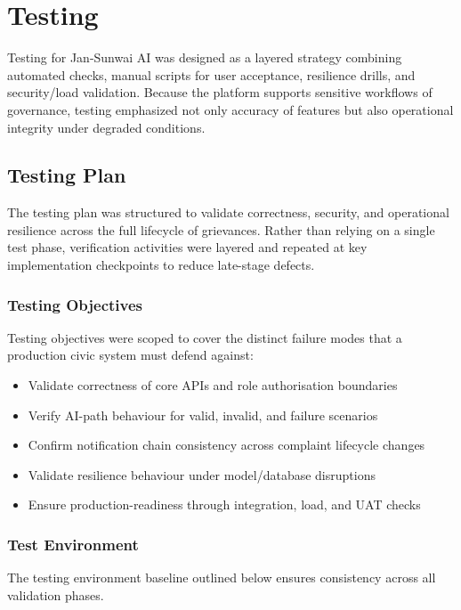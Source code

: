 \chapter{Testing}

Testing for Jan-Sunwai AI was designed as a layered strategy combining automated checks, manual scripts for user acceptance, resilience drills, and security/load validation. Because the platform supports sensitive workflows of governance, testing emphasized not only accuracy of features but also operational integrity under degraded conditions.

\section{Testing Plan}

The testing plan was structured to validate correctness, security, and operational resilience across the full lifecycle of grievances. Rather than relying on a single test phase, verification activities were layered and repeated at key implementation checkpoints to reduce late-stage defects.

\subsection{Testing Objectives}

Testing objectives were scoped to cover the distinct failure modes that a production civic system must defend against:

\begin{itemize}
\item Validate correctness of core APIs and role authorisation boundaries
\item Verify AI-path behaviour for valid, invalid, and failure scenarios
\item Confirm notification chain consistency across complaint lifecycle changes
\item Validate resilience behaviour under model/database disruptions
\item Ensure production-readiness through integration, load, and UAT checks
\end{itemize}

\subsection{Test Environment}

The testing environment baseline outlined below ensures consistency across all validation phases.

